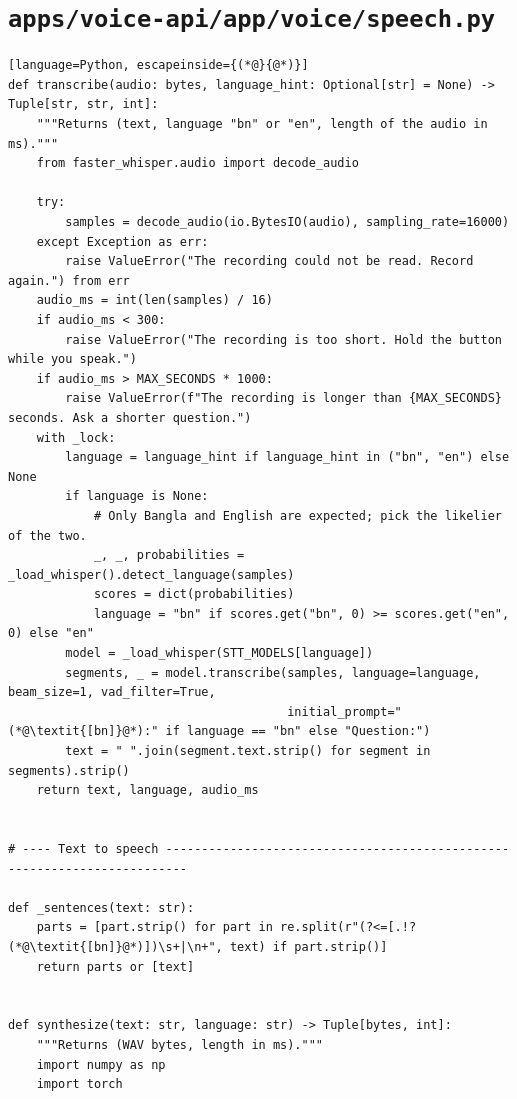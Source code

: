 \section*{\normalsize\nolinkurl{apps/voice-api/app/voice/speech.py}}

\begin{lstlisting}[language=Python, escapeinside={(*@}{@*)}]
def transcribe(audio: bytes, language_hint: Optional[str] = None) -> Tuple[str, str, int]:
    """Returns (text, language "bn" or "en", length of the audio in ms)."""
    from faster_whisper.audio import decode_audio

    try:
        samples = decode_audio(io.BytesIO(audio), sampling_rate=16000)
    except Exception as err:
        raise ValueError("The recording could not be read. Record again.") from err
    audio_ms = int(len(samples) / 16)
    if audio_ms < 300:
        raise ValueError("The recording is too short. Hold the button while you speak.")
    if audio_ms > MAX_SECONDS * 1000:
        raise ValueError(f"The recording is longer than {MAX_SECONDS} seconds. Ask a shorter question.")
    with _lock:
        language = language_hint if language_hint in ("bn", "en") else None
        if language is None:
            # Only Bangla and English are expected; pick the likelier of the two.
            _, _, probabilities = _load_whisper().detect_language(samples)
            scores = dict(probabilities)
            language = "bn" if scores.get("bn", 0) >= scores.get("en", 0) else "en"
        model = _load_whisper(STT_MODELS[language])
        segments, _ = model.transcribe(samples, language=language, beam_size=1, vad_filter=True,
                                       initial_prompt="(*@\textit{[bn]}@*):" if language == "bn" else "Question:")
        text = " ".join(segment.text.strip() for segment in segments).strip()
    return text, language, audio_ms


# ---- Text to speech -------------------------------------------------------------------------

def _sentences(text: str):
    parts = [part.strip() for part in re.split(r"(?<=[.!?(*@\textit{[bn]}@*)])\s+|\n+", text) if part.strip()]
    return parts or [text]


def synthesize(text: str, language: str) -> Tuple[bytes, int]:
    """Returns (WAV bytes, length in ms)."""
    import numpy as np
    import torch


\end{lstlisting}
